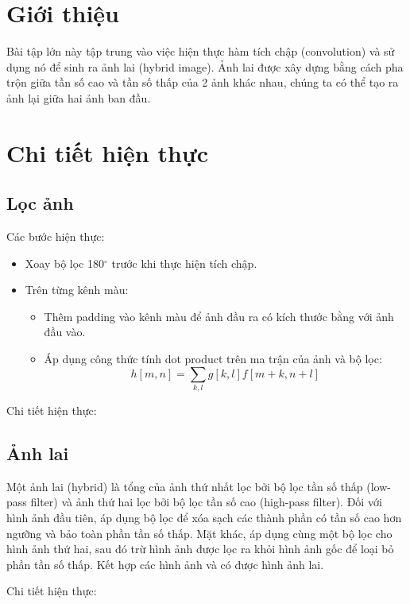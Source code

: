 \section*{Giới thiệu}
Bài tập lớn này tập trung vào việc hiện thực hàm tích chập (convolution) và sử dụng nó để sinh ra ảnh lai (hybrid image). Ảnh lai được xây dựng bằng cách pha trộn giữa tần số cao và tần số thấp của 2 ảnh khác nhau, chúng ta có thể tạo ra ảnh lại giữa hai ảnh ban đầu.

\section*{Chi tiết hiện thực}
\subsection*{Lọc ảnh}
Các bước hiện thực:
\begin{itemize}
    \item Xoay bộ lọc 180$^{\circ}$ trước khi thực hiện tích chập.
    \item Trên từng kênh màu:
        \begin{itemize}
            \item Thêm padding vào kênh màu để ảnh đầu ra có kích thước bằng với ảnh đầu vào.
            \item Áp dụng công thức tính dot product trên ma trận của ảnh và bộ lọc:
                \begin{equation*}
                    h[m,n] = \sum_{k,l} g[k,l]f[m+k,n+l]
                \end{equation*}
        \end{itemize}
\end{itemize}
Chi tiết hiện thực:

\subsection*{Ảnh lai}
Một ảnh lai (hybrid) là tổng của ảnh thứ nhất lọc bởi bộ lọc tần số thấp (low-pass filter) và ảnh thứ hai lọc bởi bộ lọc tần số cao (high-pass filter). Đối với hình ảnh đầu tiên, áp dụng bộ lọc để xóa sạch các thành phần có tần số cao hơn ngưỡng và bảo toàn phần tần số thấp. Mặt khác, áp dụng cùng một bộ lọc cho hình ảnh thứ hai, sau đó trừ hình ảnh được lọc ra khỏi hình ảnh gốc để loại bỏ phần tần số thấp. Kết hợp các hình ảnh và có được hình ảnh lai.

Chi tiết hiện thực:

